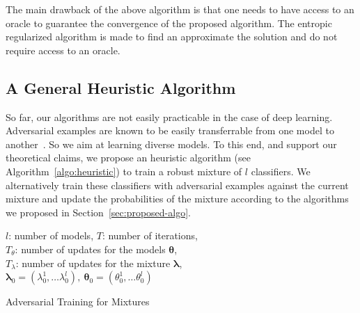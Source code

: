 The main drawback of the above algorithm is that one needs to have access to an oracle to guarantee the convergence of the proposed algorithm. The entropic regularized algorithm is made  to find an approximate the solution and do not require access to an oracle.


\subsection{A General Heuristic Algorithm}

So far, our algorithms are not easily practicable in the case of deep learning. Adversarial examples are known to be easily transferrable from one model to another~\citep{tramer2017space,papernot2016transferability}. So we aim at learning diverse models. To this end, and support our theoretical claims, we propose an heuristic algorithm (see Algorithm~\ref{algo:heuristic}) to train a robust mixture of $l$ classifiers.   We alternatively train these classifiers with adversarial examples against the current mixture and update the probabilities of the mixture according to the algorithms we proposed in Section~\ref{sec:proposed-algo}. 


\begin{algorithm}[h!]
\SetAlgoLined
$l$: number of models, $T$: number of iterations,\\
$T_\theta$: number of updates for the models $\bm{\theta}$,\\
$T_\lambda$: number of updates for the mixture $\bm{\lambda}$,\\ $\bm{\lambda}_0=(\lambda_0^1,\dots\lambda_0^l),~\bm{\theta}_0=(\theta_0^1,\dots\theta_0^l)$\\
 \caption{Adversarial Training for Mixtures}
 
 \label{algo:heuristic}
\end{algorithm}
